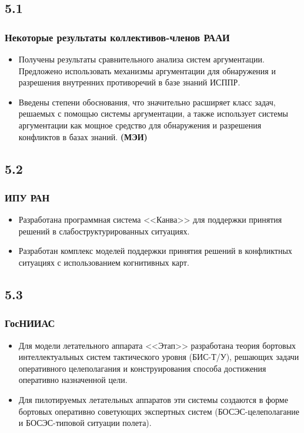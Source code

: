 \documentclass[default]{beamer}
\begin{document}
	\subsection{5.1}
	\begin{frame}
		\frametitle{Некоторые результаты коллективов-членов РААИ}
		
		\begin{itemize}
			\item Получены результаты  сравнительного анализа систем аргументации. Предложено использовать механизмы аргументации для обнаружения и разрешения внутренних противоречий в базе знаний ИСППР. 
			\item Введены степени обоснования, что значительно расширяет класс задач, решаемых с помощью системы аргументации, а также использует системы аргументации как мощное средство для обнаружения и разрешения конфликтов в базах знаний. \textbf{(МЭИ)} 
		\end{itemize}
	\end{frame}

	\subsection{5.2}
	\begin{frame}
		\frametitle{ИПУ РАН}
		\Large
		\begin{itemize}
			\item Разработана программная система <<Канва>> для поддержки принятия решений в слабоструктурированных ситуациях. 
			
			\item Разработан комплекс моделей поддержки принятия решений в конфликтных ситуациях с использованием когнитивных карт. 
			
		\end{itemize}
	\end{frame}
	
	\subsection{5.3}
	\begin{frame}
		\frametitle{ГосНИИАС}
		\Large
		\begin{itemize}
			\item Для модели летательного аппарата <<Этап>>	разработана теория бортовых 	интеллектуальных систем тактического уровня (БИС-Т/У), решающих задачи оперативного целеполагания и конструирования способа достижения оперативно назначенной цели.
			\item Для пилотируемых летательных аппаратов эти системы создаются в форме бортовых оперативно советующих экспертных систем (БОСЭС-целеполагание и БОСЭС-типовой ситуации полета). 
		\end{itemize}
	\end{frame}
\end{document}
